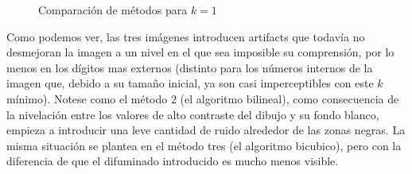 \begin{figure}[H]
    \centering
    \qquad
    \qquad
    \caption{Comparación de métodos para $k = 1$}
    \label{fig:example}
\end{figure}

Como podemos ver, las tres imágenes introducen artifacts que todavía no desmejoran la imagen a un nivel en el que sea imposible su comprensión, por lo menos en los dígitos mas externos (distinto para los números internos de la imagen que, debido a su tamaño inicial, ya son casi imperceptibles con este $k$ mínimo). Notese como el método $2$ (el algoritmo bilineal), como consecuencia de la nivelación entre los valores de alto contraste del dibujo y su fondo blanco, empieza a introducir una leve cantidad de ruido alrededor de las zonas negras. La misma situación se plantea en el método tres (el algoritmo bicubico), pero con la diferencia de que el difuminado introducido es mucho menos visible.


